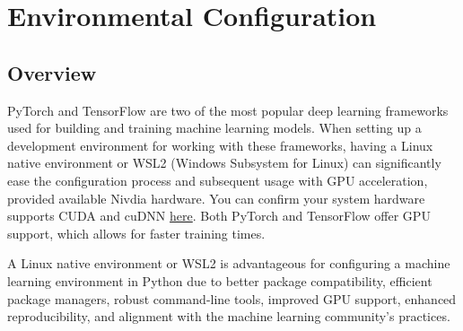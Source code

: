 \section{Environmental Configuration}
\subsection{Overview}

PyTorch and TensorFlow are two of the most popular deep learning frameworks used for building and training machine learning models. When setting up a development environment for working with these frameworks, having a Linux native environment or WSL2 (Windows Subsystem for Linux) can significantly ease the configuration process and subsequent usage with GPU acceleration, provided available Nivdia hardware. You can confirm your system hardware supports CUDA and cuDNN \href{https://developer.nvidia.com/cuda-gpus}{here}. Both PyTorch and TensorFlow offer GPU support, which allows for faster training times.

A Linux native environment or WSL2 is advantageous for configuring a machine learning environment in Python due to better package compatibility, efficient package managers, robust command-line tools, improved GPU support, enhanced reproducibility, and alignment with the machine learning community's practices.

